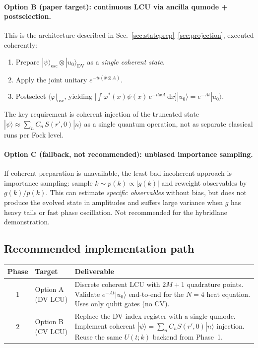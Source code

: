 \documentclass[11pt]{article}
\newcommand{\dd}{\mathrm{d}}
\begin{document}
\paragraph{Option B (paper target): continuous LCU via ancilla qumode + postselection.}

This is the architecture described in Sec.~\ref{sec:stateprep}--\ref{sec:projection},
executed coherently:
\begin{enumerate}[itemsep=2pt,topsep=2pt]
\item Prepare $|\psi\rangle_{\mathrm{osc}} \otimes |u_0\rangle_{\mathrm{DV}}$ as a \emph{single coherent state}.
\item Apply the joint unitary $e^{-it(\hat{x}\otimes A)}$.
\item Postselect $\langle\varphi|_{\mathrm{osc}}$, yielding
      $\big[\int \varphi^*(x)\psi(x)\,e^{-itxA}\,\dd x\big]|u_0\rangle = e^{-At}|u_0\rangle$.
\end{enumerate}
The key requirement is coherent injection of the truncated state
$|\psi\rangle \approx \sum_n C_n\, S(r',0)|n\rangle$ as a single quantum operation,
not as separate classical runs per Fock level.

\paragraph{Option C (fallback, not recommended): unbiased importance sampling.}

If coherent preparation is unavailable, the least-bad incoherent approach is importance sampling:
sample $k \sim p(k) \propto |g(k)|$ and reweight observables by $g(k)/p(k)$.
This can estimate \emph{specific observables} without bias, but does not produce the evolved state
in amplitudes and suffers large variance when $g$ has heavy tails or fast phase oscillation.
Not recommended for the hybridlane demonstration.

\subsection{Recommended implementation path}

\begin{center}
\begin{tabular}{clp{7cm}}
\toprule
Phase & Target & Deliverable \\
\midrule
1 & Option A (DV LCU) & Discrete coherent LCU with $2M+1$ quadrature points.
    Validate $e^{-At}|u_0\rangle$ end-to-end for the $N=4$ heat equation.
    Uses only qubit gates (no CV). \\
2 & Option B (CV LCU) & Replace the DV index register with a single qumode.
    Implement coherent $|\psi\rangle = \sum_n C_n S(r',0)|n\rangle$ injection.
    Reuse the same $U(t;k)$ backend from Phase~1. \\
\bottomrule
\end{tabular}
\end{center}
\end{document}
